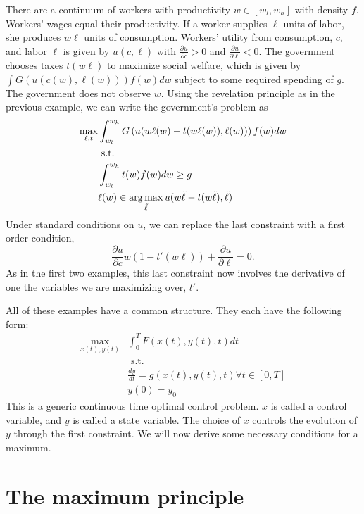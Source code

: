 \begin{example}
  There are a continuum of workers with productivity $w \in [w_l,w_h]$
  with density $f$. Workers' wages equal their productivity. If a
  worker supplies $\ell$ units of labor, she produces $w \ell$ units
  of consumption. Workers' utility from consumption, $c$, and labor
  $\ell$ is given by $u(c,\ell)$ with $\frac{\partial u}{\partial c} >
  0$ and $\frac{\partial u}{\partial \ell} < 0$. The government
  chooses taxes $t(w\ell)$ to maximize social welfare, which is given
  by $\int G(u(c(w),\ell(w))) f(w) dw$ subject to some required
  spending of $g$. The government does
  not observe $w$. Using the revelation principle as in the previous
  example, we can write the government's problem as
  \begin{align*}
    \max_{\ell,t} &  \int_{w_l}^{w_h} G\left(u(w\ell(w) - t(w\ell(w)),\ell(w))
    \right) f(w) dw \\
    & \text{ s.t. } \\
    & \int_{w_l}^{w_h} t(w) f(w) dw \geq g \\
    & \ell(w) \in \argmax_{\tilde{\ell}} u(w\tilde{\ell} - t(w\tilde{\ell}), \tilde{\ell} )
  \end{align*}  
  Under standard conditions on $u$, we can replace the last constraint
  with a first order condition,
  \[ \frac{\partial u}{\partial c} w\left(1 - t'(w\ell)\right) +
  \frac{\partial u}{\partial \ell} = 0. \]
  As in the first two examples, this last constraint now involves the
  derivative of one the variables we are maximizing over, $t'$.
\end{example}

All of these examples have a common structure. They each have the
following form:
\begin{align*}
  \max_{x(t),y(t)} & \int_0^T F(x(t),y(t),t) dt \\
  & \text{ s.t.} \\
  & \frac{d y}{dt} = g(x(t),y(t),t) \forall t \in [0,T] \\ 
  & y(0) = y_0
\end{align*}
This is a generic continuous time optimal control problem. 
$x$ is called a control variable, and $y$ is called a state
variable. The choice of $x$ controls the evolution of $y$ through the
first constraint. We will now derive some necessary conditions for a
maximum. 

\section{The maximum principle \label{sec:maxprin}}

